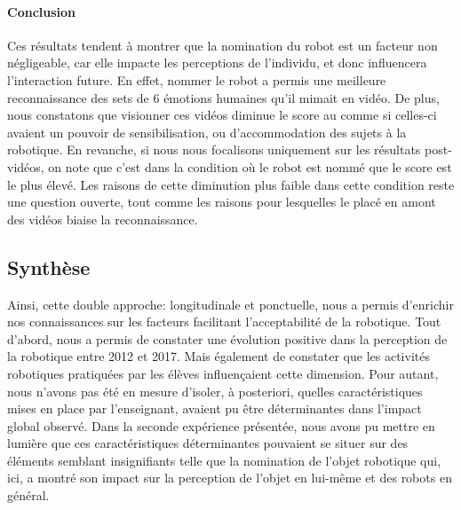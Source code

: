         \paragraph{Conclusion}
            Ces résultats tendent à montrer que la nomination du robot est un facteur non négligeable, car elle impacte les perceptions de l'individu, et donc influencera l'interaction future. En effet, nommer le robot a permis une meilleure reconnaissance des sets de 6 émotions humaines qu'il mimait en vidéo. De plus, nous constatons que visionner ces vidéos diminue le score au  comme si celles-ci avaient un pouvoir de sensibilisation, ou d'accommodation des sujets à la robotique. En revanche, si nous nous focalisons uniquement sur les résultats post-vidéos, on note que c'est dans la condition où le robot est nommé que le score est le plus élevé. Les raisons de cette diminution plus faible dans cette condition reste une question ouverte, tout comme les raisons pour lesquelles le  placé en amont des vidéos biaise la reconnaissance.
    \subsection{Synthèse}
        Ainsi, cette double approche: longitudinale et ponctuelle, nous a permis d'enrichir nos connaissances sur les facteurs facilitant l'acceptabilité de la robotique. 
        Tout d'abord,  nous a permis de constater une évolution positive dans la perception de la robotique entre 2012 et 2017. Mais également de constater que les activités robotiques pratiquées par les élèves  influençaient cette dimension.
        Pour autant, nous n'avons pas été en mesure d'isoler, à posteriori, quelles caractéristiques mises en place par l'enseignant, avaient pu être déterminantes dans l'impact global observé. 
        Dans la seconde expérience présentée, nous avons pu mettre en lumière que ces caractéristiques déterminantes pouvaient se situer sur des éléments semblant insignifiants telle que la nomination de l'objet robotique qui, ici, a montré son impact sur la perception de l'objet en lui-même et des robots en général.